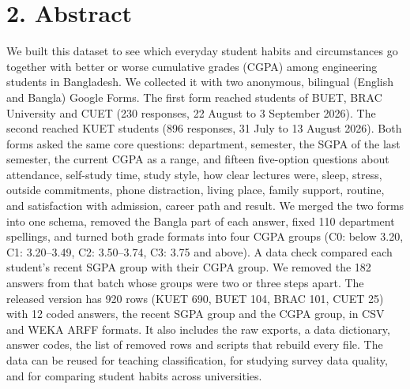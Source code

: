 \documentclass[11pt,a4paper]{article}
\begin{document}
\section{2. Abstract}
We built this dataset to see which everyday student habits and circumstances go together with better or worse cumulative grades (CGPA) among engineering students in Bangladesh. We collected it with two anonymous, bilingual (English and Bangla) Google Forms. The first form reached students of BUET, BRAC University and CUET (230 responses, 22 August to 3 September 2026). The second reached KUET students (896 responses, 31 July to 13 August 2026). Both forms asked the same core questions: department, semester, the SGPA of the last semester, the current CGPA as a range, and fifteen five-option questions about attendance, self-study time, study style, how clear lectures were, sleep, stress, outside commitments, phone distraction, living place, family support, routine, and satisfaction with admission, career path and result. We merged the two forms into one schema, removed the Bangla part of each answer, fixed 110 department spellings, and turned both grade formats into four CGPA groups (C0: below 3.20, C1: 3.20--3.49, C2: 3.50--3.74, C3: 3.75 and above). A data check compared each student's recent SGPA group with their CGPA group. We removed the 182 answers from that batch whose groups were two or three steps apart. The released version has 920 rows (KUET 690, BUET 104, BRAC 101, CUET 25) with 12 coded answers, the recent SGPA group and the CGPA group, in CSV and WEKA ARFF formats. It also includes the raw exports, a data dictionary, answer codes, the list of removed rows and scripts that rebuild every file. The data can be reused for teaching classification, for studying survey data quality, and for comparing student habits across universities.

\end{document}
